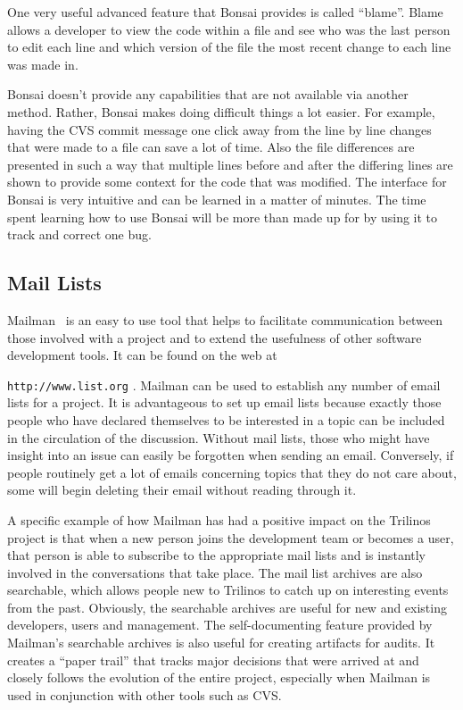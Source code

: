 \documentclass[12pt,relax]{article}
\newcommand{\InlineDirectory}[1]{
  {\hspace{0.01 in}} {\tt #1} {\hspace{0.01 in}}}
\begin{document}
One very useful advanced feature that Bonsai provides is called ``blame''.  
Blame allows a developer to view the code within a file and see who was the 
last person to edit each line and which version of the file 
the most recent change to each line was made in.

Bonsai doesn't 
provide any capabilities that are not available via another method.  
Rather, Bonsai makes doing difficult things a lot easier.
For example, having the CVS commit message one click away from the line 
by line changes that
were made to a file can save a lot of time.  Also the file differences are 
presented in such a way that multiple lines before and after the differing 
lines are shown to provide some context for the code that was modified.  
The interface for Bonsai is very intuitive and can be learned in a matter of 
minutes.  The time spent learning how to use Bonsai will be more than made up 
for by using it to track and correct one bug.

\subsection{Mail Lists}

Mailman~\cite{Mailman} is an easy to use tool that helps to facilitate 
communication between
those involved with a project and to extend the usefulness of other 
software development tools.  It can be found on the web at 
\InlineDirectory{http://www.list.org}.  Mailman can be used to establish any 
number of 
email lists for a project.  It is advantageous to set up email lists because exactly 
those people who have declared themselves to be interested in a 
topic can be included in the circulation of the discussion.  Without 
mail lists, those who might have insight into an issue can easily be forgotten 
when sending an email.  Conversely, if people routinely get a lot of emails 
concerning topics that they do not care about, some will begin deleting
their email without reading through it.

A specific example of how Mailman 
has had a positive impact on the Trilinos project is that when a new person
joins the development team or becomes a user, that person is able to 
subscribe to the appropriate mail lists and is instantly involved in the 
conversations that take place.  The mail list archives are also searchable, 
which allows people new to Trilinos to catch up on interesting events from the 
past.  Obviously, the searchable archives are useful for new and existing 
developers, users and management.  The self-documenting feature provided 
by Mailman's searchable archives is also useful for creating artifacts for 
audits.  It creates a ``paper trail'' that tracks major decisions that were 
arrived at and closely follows 
the evolution of the entire project, especially when Mailman is used in 
conjunction with other tools such as CVS.
\end{document}

